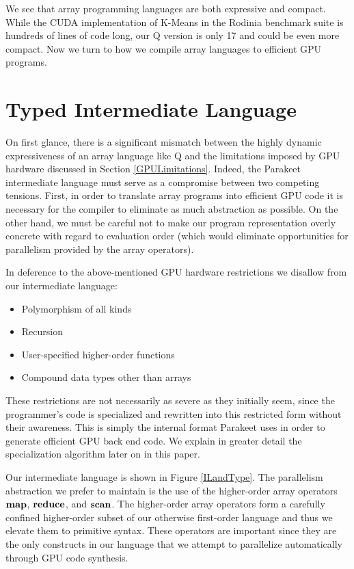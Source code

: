\documentclass[preprint]{sigplanconf}
\begin{document}
We see that array programming languages are both expressive and compact.  While
the CUDA implementation of K-Means in the Rodinia benchmark suite is hundreds of
lines of code long, our Q version is only 17 and could be even more compact.
Now we turn to how we compile array languages to efficient GPU programs.

\section{Typed Intermediate Language}
On first glance, there is a significant mismatch between the highly dynamic
expressiveness of an array language like Q and the limitations imposed by GPU
hardware discussed in Section \ref{GPULimitations}. Indeed, the Parakeet
intermediate language must serve as a compromise between two competing tensions.
First, in order to translate array programs into efficient GPU code it is
necessary for the compiler to eliminate as much abstraction as possible. On the
other hand, we must be careful not to make our program representation overly
concrete with regard to evaluation order (which would eliminate opportunities
for parallelism provided by the array operators).

In deference to the above-mentioned GPU hardware restrictions we disallow from
our intermediate language:

\begin{itemize}
\item Polymorphism of all kinds
\item Recursion
\item User-specified higher-order functions
\item Compound data types other than arrays
\end{itemize}

These restrictions are not necessarily as severe as they initially seem, since
the programmer's code is specialized and rewritten into this restricted form
without their awareness.  This is simply the internal format Parakeet uses in
order to generate efficient GPU back end code. We explain in greater detail the
specialization algorithm later on in this paper.

Our intermediate language is shown in Figure \ref{ILandType}. The parallelism
abstraction we prefer to maintain is the use of the higher-order array operators
$\mbox{\textbf{map}}$, $\mbox{\textbf{reduce}}$, and $\mbox{\textbf{scan}}$. The higher-order array operators
form a carefully confined higher-order subset of our otherwise first-order
language and thus we elevate them to primitive syntax. These operators are
important since they are the only constructs in our language that we attempt to
parallelize automatically through GPU code synthesis.
\end{document}
